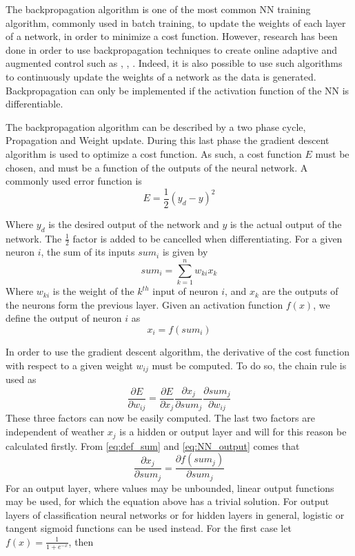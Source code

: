 The backpropagation algorithm is one of the most common NN training algorithm, commonly used in batch training, to update the weights of each layer of a network, in order to minimize a cost function. However, research has been done in order to use backpropagation techniques to create online adaptive and augmented control such as \cite{online_adaptiveNN}, \cite{UAV_adaptive}, \cite{UAV_adaptive2}. Indeed, it is also possible to use such algorithms to continuously update the weights of a network as the data is generated. Backpropagation can only be implemented if the activation function of the NN is differentiable. 

The backpropagation algorithm can be described by a two phase cycle, Propagation and Weight update. During this last phase the gradient descent algorithm is used to optimize a cost function. As such, a cost function $E$ must be chosen, and must be a function of the outputs of the neural network. A commonly used error function is 
\begin{equation}
E=\frac{1}{2} (y_d-y)^2
\end{equation}

Where $y_d$ is the desired output of the network and $y$ is the actual output of the network. The $\frac{1}{2}$ factor is added to be cancelled when differentiating. For a given neuron $i$, the sum of its inputs $sum_i$ is given by
\begin{equation}\label{eq:def_sum}
sum_i = \sum ^n_{k=1} w_{ki} x_k
\end{equation}
Where $w_{ki}$ is the weight of the $k^{th}$ input of neuron $i$, and $x_k$ are the outputs of the neurons form the previous layer. Given an activation function $f(x)$, we define the output of neuron $i$ as 
\begin{equation}\label{eq:NN_output}
x_i = f(sum_i)
\end{equation}

In order to use the gradient descent algorithm, the derivative of the cost function with respect to a given weight $w_{ij}$ must be computed. To do so, the chain rule is used as
\begin{equation}\label{eq:gradient}
\frac{\partial E}{\partial w_{ij}} = \frac{\partial E}{\partial x_j}\frac{\partial x_j}{\partial sum_j}\frac{\partial sum_j}{\partial w_{ij}}
\end{equation}
These three factors can now be easily computed. The last two factors are independent of weather $x_j$ is a hidden or output layer and will for this reason be calculated firstly. From \ref{eq:def_sum} and \ref{eq:NN_output} comes that
\begin{equation}
\frac{\partial x_j}{\partial sum_j} = \frac{\partial f(sum_j)}{\partial sum_j}
\end{equation}
For an output layer, where values may be unbounded, linear output functions may be used, for which the equation above has a trivial solution. For output layers of classification neural networks or for hidden layers in general, logistic or tangent sigmoid functions can be used instead. For the first case let $f(x)=\frac{1}{1+e^{-x}}$, then

